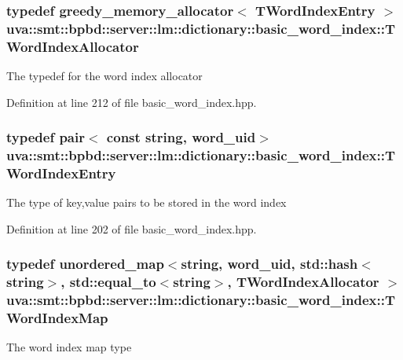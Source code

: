 \subsubsection[{T\+Word\+Index\+Allocator}]{\setlength{\rightskip}{0pt plus 5cm}typedef {\bf greedy\+\_\+memory\+\_\+allocator}$<$ {\bf T\+Word\+Index\+Entry} $>$ {\bf uva\+::smt\+::bpbd\+::server\+::lm\+::dictionary\+::basic\+\_\+word\+\_\+index\+::\+T\+Word\+Index\+Allocator}}\label{classuva_1_1smt_1_1bpbd_1_1server_1_1lm_1_1dictionary_1_1basic__word__index_a7dcfe947b277f05987cf55dfbd1fd021}
The typedef for the word index allocator 

Definition at line 212 of file basic\+\_\+word\+\_\+index.\+hpp.

\hypertarget{classuva_1_1smt_1_1bpbd_1_1server_1_1lm_1_1dictionary_1_1basic__word__index_a61bd773bb1c79c5be7679fc557f27747}{}
\subsubsection[{T\+Word\+Index\+Entry}]{\setlength{\rightskip}{0pt plus 5cm}typedef pair$<$ const string, {\bf word\+\_\+uid}$>$ {\bf uva\+::smt\+::bpbd\+::server\+::lm\+::dictionary\+::basic\+\_\+word\+\_\+index\+::\+T\+Word\+Index\+Entry}}\label{classuva_1_1smt_1_1bpbd_1_1server_1_1lm_1_1dictionary_1_1basic__word__index_a61bd773bb1c79c5be7679fc557f27747}
The type of key,value pairs to be stored in the word index 

Definition at line 202 of file basic\+\_\+word\+\_\+index.\+hpp.

\hypertarget{classuva_1_1smt_1_1bpbd_1_1server_1_1lm_1_1dictionary_1_1basic__word__index_ab58bffa80202cb71ba13ba19814b622c}{}
\subsubsection[{T\+Word\+Index\+Map}]{\setlength{\rightskip}{0pt plus 5cm}typedef unordered\+\_\+map$<$string, {\bf word\+\_\+uid}, std\+::hash$<$string$>$, std\+::equal\+\_\+to$<$string$>$, {\bf T\+Word\+Index\+Allocator} $>$ {\bf uva\+::smt\+::bpbd\+::server\+::lm\+::dictionary\+::basic\+\_\+word\+\_\+index\+::\+T\+Word\+Index\+Map}}\label{classuva_1_1smt_1_1bpbd_1_1server_1_1lm_1_1dictionary_1_1basic__word__index_ab58bffa80202cb71ba13ba19814b622c}
The word index map type 

